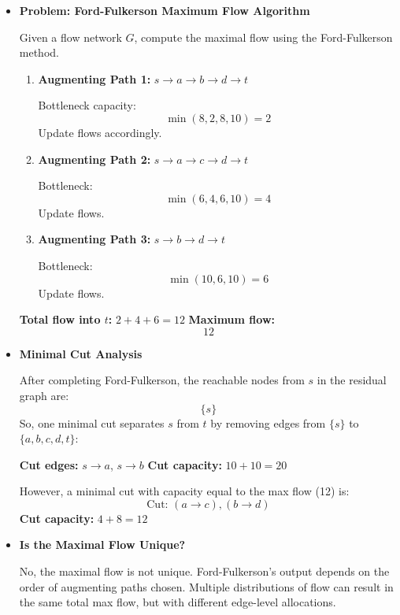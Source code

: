 \documentclass[11pt]{article}
\begin{document}
\begin{itemize}[leftmargin=*]

\item \textbf{Problem: Ford-Fulkerson Maximum Flow Algorithm}

Given a flow network \( G \), compute the maximal flow using the Ford-Fulkerson method.

\begin{enumerate}
    \item \textbf{Augmenting Path 1:} \( s \rightarrow a \rightarrow b \rightarrow d \rightarrow t \)

    Bottleneck capacity:
    \[
    \min(8, 2, 8, 10) = 2
    \]
    Update flows accordingly.

    \item \textbf{Augmenting Path 2:} \( s \rightarrow a \rightarrow c \rightarrow d \rightarrow t \)

    Bottleneck:
    \[
    \min(6, 4, 6, 10) = 4
    \]
    Update flows.

    \item \textbf{Augmenting Path 3:} \( s \rightarrow b \rightarrow d \rightarrow t \)

    Bottleneck:
    \[
    \min(10, 6, 10) = 6
    \]
    Update flows.
\end{enumerate}

\textbf{Total flow into \( t \):} \( 2 + 4 + 6 = 12 \)  
\textbf{Maximum flow:}  
\[
\boxed{12}
\]

\vspace{1em}

\item \textbf{Minimal Cut Analysis}

After completing Ford-Fulkerson, the reachable nodes from \( s \) in the residual graph are:
\[
\{s\}
\]
So, one minimal cut separates \( s \) from \( t \) by removing edges from \( \{s\} \) to \( \{a, b, c, d, t\} \):

\textbf{Cut edges:} \( s \rightarrow a \), \( s \rightarrow b \)  
\textbf{Cut capacity:} \( 10 + 10 = 20 \)

However, a minimal cut with capacity equal to the max flow (12) is:
\[
\text{Cut: } (a \rightarrow c), (b \rightarrow d)
\]
\textbf{Cut capacity:} \( 4 + 8 = \boxed{12} \)

\vspace{1em}

\item \textbf{Is the Maximal Flow Unique?}

No, the maximal flow is not unique.  
Ford-Fulkerson’s output depends on the order of augmenting paths chosen. Multiple distributions of flow can result in the same total max flow, but with different edge-level allocations.

\end{itemize}
\end{document}
